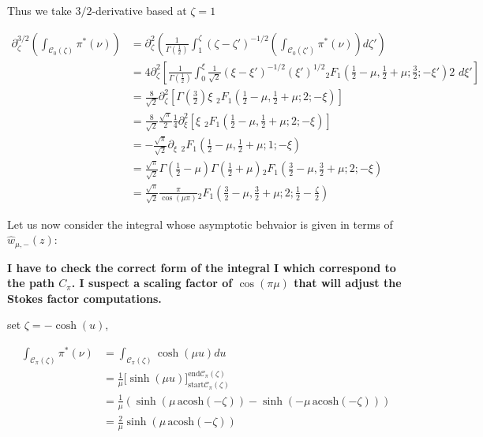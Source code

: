 \documentclass{article}
\begin{document}
Thus we take $3/2$-derivative based at $\zeta=1$

\begin{align*}
\partial_{\zeta}^{3/2}\left(\int_{\mathcal{C}_0(\zeta)}\pi^*(\nu)\right)&=\partial_\zeta^2\left(\frac{1}{\Gamma\left(\frac{1}{2}\right)}\int_1^\zeta(\zeta-\zeta')^{-1/2}\left(\int_{\mathcal{C}_0(\zeta')}\pi^*(\nu)\right)d\zeta'\right)\\
&=4\partial_\zeta^2\left[\frac{1}{\Gamma\left(\frac{1}{2}\right)}\int_0^\xi\frac{1}{\sqrt{2}}(\xi-\xi')^{-1/2}(\xi')^{1/2} {}_2F_1\left(\frac{1}{2}-\mu,\frac{1}{2}+\mu;\frac{3}{2};-\xi'\right) 2\,\,d\xi'\right]\\
&=\frac{8}{\sqrt{2}}\partial_\zeta^2\left[\Gamma\left(\frac{3}{2}\right)\xi\,\,{}_2F_1\left(\frac{1}{2}-\mu,\frac{1}{2}+\mu;2;-\xi\right)\right] \\
&=\frac{8}{\sqrt{2}}\frac{\sqrt{\pi}}{2}\frac{1}{4}\partial_\xi^2\left[\xi\,\,{}_2F_1\left(\frac{1}{2}-\mu,\frac{1}{2}+\mu;2;-\xi\right)\right]\\
&=-\frac{\sqrt{\pi}}{\sqrt{2}}\partial_{\xi}\,\, {}_2F_1\left(\frac{1}{2}-\mu,\frac{1}{2}+\mu;1;-\xi\right)\\
&=\frac{\sqrt{\pi}}{\sqrt{2}}\Gamma\left(\frac{1}{2}-\mu\right)\Gamma\left(\frac{1}{2}+\mu\right){}_2F_1\left(\frac{3}{2}-\mu,\frac{3}{2}+\mu;2;-\xi\right)\\
&=\frac{\sqrt{\pi}}{\sqrt{2}}\frac{\pi}{\cos(\mu \pi)}{}_2F_1\left(\frac{3}{2}-\mu,\frac{3}{2}+\mu;2;\frac{1}{2}-\frac{\zeta}{2}\right)
\end{align*}



Let us now consider the integral whose asymptotic behvaior is given in terms of $\hat{w}_{\mu,-}(z)$:

\textbf{I have to check the correct form of the integral I which correspond to the path $C_\pi$. I suspect a scaling factor of $\cos(\pi \mu)$ that will adjust the Stokes factor computations.}

set $\zeta=-\cosh(u)$, 

\begin{align*}
\int_{\mathcal{C}_\pi(\zeta)}\pi^*(\nu)&=\int_{\mathcal{C}_\pi(\zeta)}\cosh(\mu u)du\\
&=\frac{1}{\mu}\Big[\sinh(\mu u)\Big]_{\mathrm{start}\mathcal{C}_\pi(\zeta)}^{\mathrm{end}\mathcal{C}_\pi(\zeta)}\\
&=\frac{1}{\mu}\left(\sinh\left(\mu\,\mathrm{acosh}\left(-\zeta\right)\right)-\sinh\left(-\mu\,\mathrm{acosh}\left(-\zeta\right)\right)\right)\\
&=\frac{2}{\mu}\sinh\left(\mu\,\mathrm{acosh}\left(-\zeta\right)\right)
\end{align*}
\end{document}
